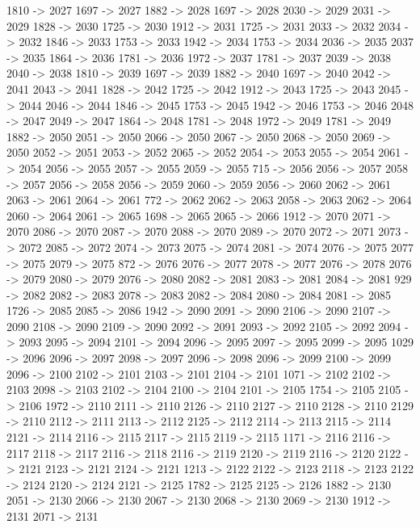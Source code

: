 {	1810 -> 2027
	1697 -> 2027
	1882 -> 2028
	1697 -> 2028
	2030 -> 2029
	2031 -> 2029
	1828 -> 2030
	1725 -> 2030
	1912 -> 2031
	1725 -> 2031
	2033 -> 2032
	2034 -> 2032
	1846 -> 2033
	1753 -> 2033
	1942 -> 2034
	1753 -> 2034
	2036 -> 2035
	2037 -> 2035
	1864 -> 2036
	1781 -> 2036
	1972 -> 2037
	1781 -> 2037
	2039 -> 2038
	2040 -> 2038
	1810 -> 2039
	1697 -> 2039
	1882 -> 2040
	1697 -> 2040
	2042 -> 2041
	2043 -> 2041
	1828 -> 2042
	1725 -> 2042
	1912 -> 2043
	1725 -> 2043
	2045 -> 2044
	2046 -> 2044
	1846 -> 2045
	1753 -> 2045
	1942 -> 2046
	1753 -> 2046
	2048 -> 2047
	2049 -> 2047
	1864 -> 2048
	1781 -> 2048
	1972 -> 2049
	1781 -> 2049
	1882 -> 2050
	2051 -> 2050
	2066 -> 2050
	2067 -> 2050
	2068 -> 2050
	2069 -> 2050
	2052 -> 2051
	2053 -> 2052
	2065 -> 2052
	2054 -> 2053
	2055 -> 2054
	2061 -> 2054
	2056 -> 2055
	2057 -> 2055
	2059 -> 2055
	715 -> 2056
	2056 -> 2057
	2058 -> 2057
	2056 -> 2058
	2056 -> 2059
	2060 -> 2059
	2056 -> 2060
	2062 -> 2061
	2063 -> 2061
	2064 -> 2061
	772 -> 2062
	2062 -> 2063
	2058 -> 2063
	2062 -> 2064
	2060 -> 2064
	2061 -> 2065
	1698 -> 2065
	2065 -> 2066
	1912 -> 2070
	2071 -> 2070
	2086 -> 2070
	2087 -> 2070
	2088 -> 2070
	2089 -> 2070
	2072 -> 2071
	2073 -> 2072
	2085 -> 2072
	2074 -> 2073
	2075 -> 2074
	2081 -> 2074
	2076 -> 2075
	2077 -> 2075
	2079 -> 2075
	872 -> 2076
	2076 -> 2077
	2078 -> 2077
	2076 -> 2078
	2076 -> 2079
	2080 -> 2079
	2076 -> 2080
	2082 -> 2081
	2083 -> 2081
	2084 -> 2081
	929 -> 2082
	2082 -> 2083
	2078 -> 2083
	2082 -> 2084
	2080 -> 2084
	2081 -> 2085
	1726 -> 2085
	2085 -> 2086
	1942 -> 2090
	2091 -> 2090
	2106 -> 2090
	2107 -> 2090
	2108 -> 2090
	2109 -> 2090
	2092 -> 2091
	2093 -> 2092
	2105 -> 2092
	2094 -> 2093
	2095 -> 2094
	2101 -> 2094
	2096 -> 2095
	2097 -> 2095
	2099 -> 2095
	1029 -> 2096
	2096 -> 2097
	2098 -> 2097
	2096 -> 2098
	2096 -> 2099
	2100 -> 2099
	2096 -> 2100
	2102 -> 2101
	2103 -> 2101
	2104 -> 2101
	1071 -> 2102
	2102 -> 2103
	2098 -> 2103
	2102 -> 2104
	2100 -> 2104
	2101 -> 2105
	1754 -> 2105
	2105 -> 2106
	1972 -> 2110
	2111 -> 2110
	2126 -> 2110
	2127 -> 2110
	2128 -> 2110
	2129 -> 2110
	2112 -> 2111
	2113 -> 2112
	2125 -> 2112
	2114 -> 2113
	2115 -> 2114
	2121 -> 2114
	2116 -> 2115
	2117 -> 2115
	2119 -> 2115
	1171 -> 2116
	2116 -> 2117
	2118 -> 2117
	2116 -> 2118
	2116 -> 2119
	2120 -> 2119
	2116 -> 2120
	2122 -> 2121
	2123 -> 2121
	2124 -> 2121
	1213 -> 2122
	2122 -> 2123
	2118 -> 2123
	2122 -> 2124
	2120 -> 2124
	2121 -> 2125
	1782 -> 2125
	2125 -> 2126
	1882 -> 2130
	2051 -> 2130
	2066 -> 2130
	2067 -> 2130
	2068 -> 2130
	2069 -> 2130
	1912 -> 2131
	2071 -> 2131
}
